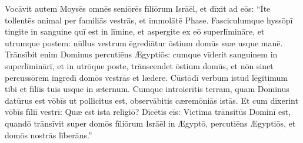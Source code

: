 Vocāvit autem Moysēs omnēs seniōrēs fīliōrum Isrāēl, et
dīxit ad eōs: ``Īte tollentēs animal per familiās vestrās, et immolātē
Phase. Fasciculumque hyssōpī
tingite in sanguine quī est in līmine, et aspergite ex eō
superlīmināre, et utrumque postem: nūllus vestrum
ēgrediātur ōstium domūs suæ usque manē. Trānsībit enim Dominus
percutiēns Ægyptiōs: cumque vīderit sanguinem in
superlīminārī, et in utrōque poste,
trānscendet ōstium domūs, et nōn sinet
percussōrem ingredī domōs vestrās
et lædere. Cūstōdī verbum istud lēgitimum tibi et fīliīs
tuīs usque in æternum. Cumque introierītis terram, quam Dominus datūrus est vōbīs ut pollicitus
est, observābitis cæremōniās istās. Et cum dīxerint
vōbīs fīliī vestrī: Quæ est ista religiō? Dīcētis eīs:
Victima trānsitūs Dominī est, quandō trānsīvit super
domōs fīliōrum Isrāēl in Ægyptō, percutiēns Ægyptiōs, et domōs nostrās
līberāns.''

